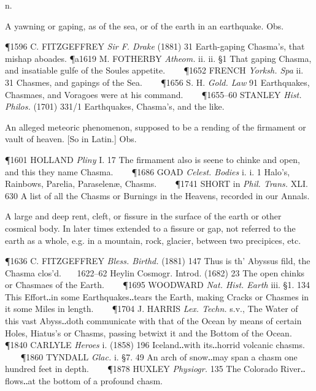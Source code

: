 \begin{description}[wide, labelwidth=!, labelindent=0pt]
 n.

\noindent {}

\vspace{-0.3cm}

\begin{myenumerate}

 A yawning or gaping, as of the sea, or of the earth in an earthquake. Obs.

\P 1596 C. FITZGEFFREY  \textit{Sir F. Drake} (1881) 31 Earth-gaping Chasma's, that mishap aboades.
\P a1619 M. FOTHERBY  \textit{Atheom.} ii. ii. §1 That gaping Chasma, and insatiable gulfe of the Soules appetite.    
\P 1652 FRENCH  \textit{Yorksh. Spa} ii. 31 Chasmes, and gapings of the Sea.    
\P 1656 S. H. \textit{Gold.  Law} 91 Earthquakes, Chasmaes, and Voragoes were at his command.    
\P 1655–60 STANLEY \textit{Hist. Philos.} (1701) 331/1 Earthquakes, Chasma's, and the like.

 An alleged meteoric phenomenon, supposed to be a rending of the firmament or vault of heaven. [So in Latin.] Obs.

\P 1601 HOLLAND  \textit{Pliny} I. 17 The firmament also is seene to chinke and open, and this they name Chasma.    
\P 1686 GOAD  \textit{Celest. Bodies} i. i. 1 Halo's, Rainbows, Parelia, Paraselenæ, Chasms.    
\P 1741 SHORT in \textit{Phil. Trans.} XLI. 630 A list of all the Chasms or Burnings in the Heavens, recorded in our Annals.

 A large and deep rent, cleft, or fissure in the surface of the earth or other cosmical body. In later times extended to a fissure or gap, not referred to the earth as a whole, e.g. in a mountain, rock, glacier, between two precipices, etc.

\P 1636 C. FITZGEFFREY  \textit{Bless. Birthd.} (1881) 147 Thus is th' Abyssus fild, the Chasma clos'd.    1622–62 Heylin Cosmogr. Introd. (1682) 23 The open chinks or Chasmaes of the Earth.    
\P 1695 WOODWARD  \textit{Nat. Hist. Earth} iii. §1. 134 This Effort‥in some Earthquakes‥tears the Earth, making Cracks or Chasmes in it some Miles in length.    
\P 1704 J. HARRIS  \textit{Lex. Techn.} s.v., The Water of this vast Abyss‥doth communicate with that of the Ocean by means of certain Holes, Hiatus's or Chasms, passing betwixt it and the Bottom of the Ocean.    
\P 1840 CARLYLE  \textit{Heroes} i. (1858) 196 Iceland‥with its‥horrid volcanic chasms.    
\P 1860 TYNDALL  \textit{Glac.} i. §7. 49 An arch of snow‥may span a chasm one hundred feet in depth.    
\P 1878 HUXLEY  \textit{Physiogr.} 135 The Colorado River‥flows‥at the bottom of a profound chasm.


\end{myenumerate}
\end{description}

